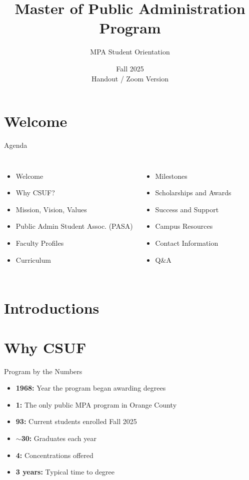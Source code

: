 \documentclass[10pt]{beamer}
\title{Master of Public Administration Program}
\subtitle{MPA Student Orientation}
\date{Fall 2025 \\ \tiny{Handout / Zoom Version}}
\begin{document}

\maketitle

\section{\textcolor{titanorange}{Welcome}}
\begin{frame}{Agenda}
\begin{columns}[T,onlytextwidth]
    \begin{itemize}\setlength{\itemsep}{2pt}
      \item Welcome
      \item Why CSUF? %
      \item Mission, Vision, Values
      \item Public Admin Student Assoc. (PASA) %
      \item Faculty Profiles
      \item Curriculum
    \end{itemize}
    \begin{itemize}\setlength{\itemsep}{2pt}
      \item Milestones
      \item Scholarships and Awards
      \item Success and Support
      \item Campus Resources
      \item Contact Information
      \item Q\&A
    \end{itemize}
\end{columns}
\end{frame}

\section{\textcolor{titanorange}{Introductions}}

\section{\textcolor{titanorange}{Why CSUF}}
\begin{frame}{Program by the Numbers}
\begin{Large}
\begin{itemize}
  \item \textbf{1968:} Year the program began awarding degrees
  \item \textbf{1:} The only public MPA program in Orange County
  \item \textbf{93:} Current students enrolled Fall 2025
  \item \textbf{\(\sim\)30:} Graduates each year
  \item \textbf{4:} Concentrations offered
  \item \textbf{3 years:} Typical time to degree
\end{itemize}
\end{Large}
\end{frame}
\end{document}
